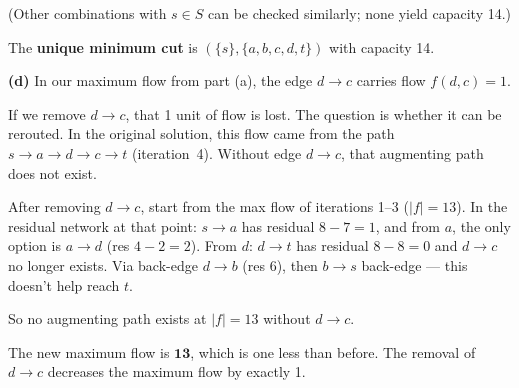 \documentclass[11pt,a4paper]{article}
\begin{document}
(Other combinations with $s\in S$ can be checked similarly; none yield capacity 14.)

The \textbf{unique minimum cut} is $(\{s\}, \{a,b,c,d,t\})$ with capacity 14.
\medskip

\textbf{(d)} In our maximum flow from part (a), the edge $d\to c$ carries flow $f(d,c)=1$.

If we remove $d\to c$, that 1 unit of flow is lost. The question is whether it can be rerouted. In the original solution, this flow came from the path $s\to a\to d\to c\to t$ (iteration~4). Without edge $d\to c$, that augmenting path does not exist.

After removing $d\to c$, start from the max flow of iterations 1--3 ($|f|=13$). In the residual network at that point: $s\to a$ has residual $8-7=1$, and from $a$, the only option is $a\to d$ (res $4-2=2$). From $d$: $d\to t$ has residual $8-8=0$ and $d\to c$ no longer exists. Via back-edge $d\to b$ (res $6$), then $b\to s$ back-edge --- this doesn't help reach $t$.

So no augmenting path exists at $|f|=13$ without $d\to c$.

The new maximum flow is $\mathbf{13}$, which is one less than before. The removal of $d\to c$ decreases the maximum flow by exactly 1.
\end{document}
